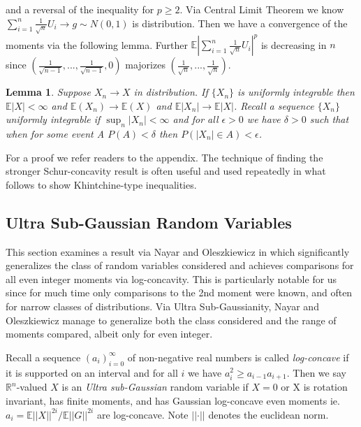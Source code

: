 \documentclass[10pt]{article}
\newcommand{\E}{\mathbb{E}}
\newcommand{\1}{\textbf{1}}
\newcommand{\R}{\mathbb{R}}
\newcommand{\norm}[1]{\left\lvert\left\lvert#1\right\rvert\right\rvert}
\newcommand{\normOne}[1]{\left\lvert#1\right\rvert}
\newtheorem{lemma}[theorem]{Lemma}
\theoremstyle{remark}
\theoremstyle{definition}
\begin{document}
and a reversal of the inequality for $p \geq 2$. Via Central Limit Theorem we know $\sum_{i=1}^n \frac{1}{\sqrt{n}} U_i \to g \sim N(0,1)$ is distribution. Then we have a convergence of the moments via the following lemma. Further $\E\normOne{\sum_{i=1}^n \frac{1}{\sqrt{n}}U_i}^p$ is decreasing in $n$ since $(\frac{1}{\sqrt{n-1}},...,\frac{1}{\sqrt{n-1}},0)$ majorizes $(\frac{1}{\sqrt{n}},...,\frac{1}{\sqrt{n}})$.


\begin{lemma}\label{lem:URV5}
	Suppose $X_n \to X$ in distribution. If $\{X_n\}$ is uniformly integrable then $\E|X| < \infty$ and $\E(X_n) \to \E(X)$ and $\E |X_n| \to \E |X|$. Recall a sequence $\{X_n\}$ uniformly integrable if $\sup_n |X_n| < \infty$ and for all $\epsilon > 0$ we have $\delta > 0$ such that when for some event A $P(A) < \delta$ then $P(|X_n| \in A) < \epsilon$. 
\end{lemma}

For a proof we refer readers to the appendix. The technique of finding the stronger Schur-concavity result is often useful and used repeatedly in what follows to show Khintchine-type inequalities.



\subsection{Ultra Sub-Gaussian Random Variables}

This section examines a result via Nayar and Oleszkiewicz in \cite{NO} which significantly generalizes the class of random variables considered and achieves comparisons for all even integer moments via log-concavity. This is particularly notable for us since for much time only comparisons to the 2nd moment were known, and often for narrow classes of distributions. Via Ultra Sub-Gaussianity, Nayar and Oleszkiewicz manage to generalize both the class considered and the range of moments compared, albeit only for even integer.

Recall a sequence $(a_i)_{i=0}^{\infty}$ of non-negative real numbers is called \textit{log-concave} if it is supported on an interval and for all $i$ we have $a_i^2 \geq a_{i-1}a_{i+1}$. Then we say $\R^n$-valued $X$ is an \textit{Ultra sub-Gaussian} random variable if $X=0$ or X is rotation invariant, has finite moments, and has Gaussian log-concave even moments ie. $a_i = \E \norm{X}^{2i}/\E \norm{G}^{2i}$ are log-concave. Note $\norm{\cdot}$ denotes the euclidean norm. 
\end{document}
